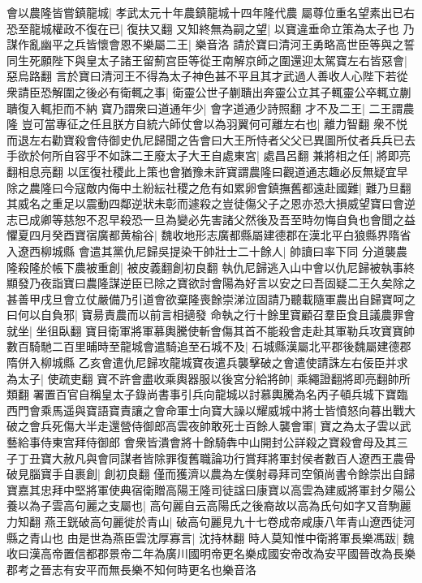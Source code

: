 會以農隆皆嘗鎮龍城|{
	孝武太元十年農鎮龍城十四年隆代農}
屬尊位重名望素出已右恐至龍城權政不復在已|{
	復扶又翻}
又知終無為嗣之望|{
	以寶違垂命立策為太子也}
乃謀作亂幽平之兵皆懷會恩不樂屬二王|{
	樂音洛}
請於寶曰清河王勇略高世臣等與之誓同生死願陛下與皇太子諸王留薊宫臣等從王南解京師之圍還迎太駕寶左右皆惡會|{
	惡烏路翻}
言於寶曰清河王不得為太子神色甚不平且其才武過人善收人心陛下若從衆請臣恐解圍之後必有衛輒之事|{
	衛靈公世子蒯聵出奔靈公立其子輒靈公卒輒立蒯聵復入輒拒而不納}
寶乃謂衆曰道通年少|{
	會字道通少詩照翻}
才不及二王|{
	二王謂農隆}
豈可當專征之任且朕方自統六師仗會以為羽翼何可離左右也|{
	離力智翻}
衆不悦而退左右勸寶殺會侍御史仇尼歸聞之告會曰大王所恃者父父已異圖所仗者兵兵已去手欲於何所自容乎不如誅二王廢太子大王自處東宮|{
	處昌呂翻}
兼將相之任|{
	將即亮翻相息亮翻}
以匡復社稷此上策也會猶豫未許寶謂農隆曰觀道通志趣必反無疑宜早除之農隆曰今寇敵内侮中土紛紜社稷之危有如累卵會鎮撫舊都遠赴國難|{
	難乃旦翻}
其威名之重足以震動四鄰逆狀未彰而遽殺之豈徒傷父子之恩亦恐大損威望寶曰會逆志已成卿等慈恕不忍早殺恐一旦為變必先害諸父然後及吾至時勿悔自負也會聞之益懼夏四月癸酉寶宿廣都黄榆谷|{
	魏收地形志廣都縣屬建德郡在漢北平白狼縣界隋省入遼西柳城縣}
會遣其黨仇尼歸吳提染干帥壯士二十餘人|{
	帥讀曰率下同}
分道襲農隆殺隆於帳下農被重創|{
	被皮義翻創初良翻}
執仇尼歸逃入山中會以仇尼歸被執事終顯發乃夜詣寶曰農隆謀逆臣已除之寶欲討會陽為好言以安之曰吾固疑二王久矣除之甚善甲戌旦會立仗嚴備乃引道會欲棄隆喪餘崇涕泣固請乃聽載隨軍農出自歸寶呵之曰何以自負邪|{
	寶昜責農而以前言相擿發}
命執之行十餘里寶顧召羣臣食且議農罪會就坐|{
	坐徂臥翻}
寶目衛軍將軍慕輿騰使斬會傷其首不能殺會走赴其軍勒兵攻寶寶帥數百騎馳二百里晡時至龍城會遣騎追至石城不及|{
	石城縣漢屬北平郡後魏屬建德郡隋併入柳城縣}
乙亥會遣仇尼歸攻龍城寶夜遣兵襲擊破之會遣使請誅左右佞臣并求為太子|{
	使疏吏翻}
寶不許會盡收乘輿器服以後宮分給將帥|{
	乘繩證翻將即亮翻帥所類翻}
署置百官自稱皇太子錄尚書事引兵向龍城以討慕輿騰為名丙子頓兵城下寶臨西門會乘馬遥與寶語寶責讓之會命軍士向寶大譟以耀威城中將士皆憤怒向暮出戰大破之會兵死傷大半走還營侍御郎高雲夜帥敢死士百餘人襲會軍|{
	寶之為太子雲以武藝給事侍東宫拜侍御郎}
會衆皆潰會將十餘騎犇中山開封公詳殺之寶殺會母及其三子丁丑寶大赦凡與會同謀者皆除罪復舊職論功行賞拜將軍封侯者數百人遼西王農骨破見腦寶手自裹創|{
	創初良翻}
僅而獲濟以農為左僕射尋拜司空領尚書令餘崇出自歸寶嘉其忠拜中堅將軍使典宿衛贈高陽王隆司徒諡曰康寶以高雲為建威將軍封夕陽公養以為子雲高句麗之支屬也|{
	高句麗自云高陽氏之後裔故以高為氏句如字又音駒麗力知翻}
燕王皝破高句麗徙於青山|{
	破高句麗見九十七卷成帝咸康八年青山遼西徒河縣之青山也}
由是世為燕臣雲沈厚寡言|{
	沈持林翻}
時人莫知惟中衛將軍長樂馮跋|{
	魏收曰漢高帝置信都郡景帝二年為廣川國明帝更名樂成國安帝改為安平國晉改為長樂郡考之晉志有安平而無長樂不知何時更名也樂音洛}
